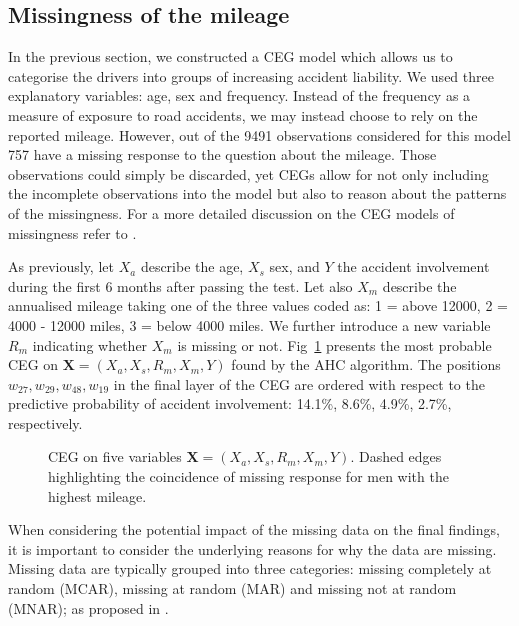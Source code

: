 \documentclass[runningheads]{llncs}
\begin{document}
\subsection{Missingness of the mileage}\label{subsec:missing-miles}
In the previous section, we constructed a CEG model which allows us to categorise the drivers into groups of increasing accident liability. We used three explanatory variables: age, sex and frequency. Instead of the frequency as a measure of exposure to road accidents, we may instead choose to rely on the reported mileage. However, out of the 9491 observations considered for this model 757 have a missing response to the question about the mileage. Those observations could simply be discarded, yet CEGs allow for not only including the incomplete observations into the model but also to reason about the patterns of the missingness. For a more detailed discussion on the CEG models of missingness refer to \cite{barclay2014missingness}. 

As previously, let $X_a$ describe the age, $X_s$ sex, and $Y$ the accident involvement during the first 6 months after passing the test. Let also $X_m$ describe the annualised mileage taking one of the three values coded as:  1 = above 12000, 2 = 4000 - 12000 miles, 3 = below 4000 miles. We further introduce a new variable $R_m$ indicating whether $X_m$ is missing or not. Fig~\ref{ceg:mis-miles} presents the most probable CEG on $\boldsymbol{X} = (X_a, X_s, R_m, X_m, Y)$ found by the AHC algorithm. The positions $w_{27}, w_{29}, w_{48}, w_{19}$ in the final layer of the CEG are ordered with respect to the predictive probability of accident involvement: 14.1\%, 8.6\%, 4.9\%, 2.7\%, respectively.
\begin{figure}
\centering

\caption{CEG on five variables $\boldsymbol{X} = (X_a, X_s, R_m, X_m, Y)$. Dashed edges highlighting the coincidence of missing response for men with the highest mileage.}
\label{ceg:mis-miles}
\end{figure}
When considering the potential impact of the missing data on the final findings, it is important to consider the underlying reasons for why the data are missing. Missing data are typically grouped into three categories: missing completely at random (MCAR), missing at random (MAR) and missing not at random (MNAR); as proposed in \cite{rubin1989nonresponse}. 
\end{document}
